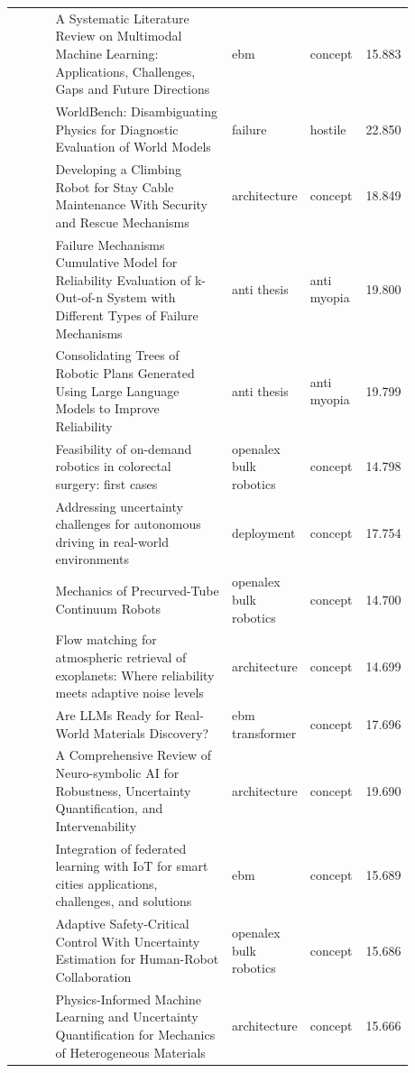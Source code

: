 \documentclass{article}
\begin{document}
\begin{center}
\begin{longtable}{p{0.12\linewidth}p{0.48\linewidth}p{0.14\linewidth}p{0.14\linewidth}r}
\citep{pool88_52} & A Systematic Literature Review on Multimodal Machine Learning: Applications, Challenges, Gaps and Future Directions & ebm & concept & 15.883\\
\citep{pool88_53} & WorldBench: Disambiguating Physics for Diagnostic Evaluation of World Models & failure & hostile & 22.850\\
\citep{pool88_54} & Developing a Climbing Robot for Stay Cable Maintenance With Security and Rescue Mechanisms & architecture & concept & 18.849\\
\citep{pool88_55} & Failure Mechanisms Cumulative Model for Reliability Evaluation of k-Out-of-n System with Different Types of Failure Mechanisms & anti thesis & anti myopia & 19.800\\
\citep{pool88_56} & Consolidating Trees of Robotic Plans Generated Using Large Language Models to Improve Reliability & anti thesis & anti myopia & 19.799\\
\citep{pool88_57} & Feasibility of on-demand robotics in colorectal surgery: first cases & openalex bulk robotics & concept & 14.798\\
\citep{pool88_58} & Addressing uncertainty challenges for autonomous driving in real-world environments & deployment & concept & 17.754\\
\citep{pool88_59} & Mechanics of Precurved-Tube Continuum Robots & openalex bulk robotics & concept & 14.700\\
\citep{pool88_60} & Flow matching for atmospheric retrieval of exoplanets: Where reliability meets adaptive noise levels & architecture & concept & 14.699\\
\citep{pool88_61} & Are LLMs Ready for Real-World Materials Discovery? & ebm transformer & concept & 17.696\\
\citep{pool88_62} & A Comprehensive Review of Neuro-symbolic AI for Robustness, Uncertainty Quantification, and Intervenability & architecture & concept & 19.690\\
\citep{pool88_63} & Integration of federated learning with IoT for smart cities applications, challenges, and solutions & ebm & concept & 15.689\\
\citep{pool88_64} & Adaptive Safety-Critical Control With Uncertainty Estimation for Human-Robot Collaboration & openalex bulk robotics & concept & 15.686\\
\citep{pool88_65} & Physics-Informed Machine Learning and Uncertainty Quantification for Mechanics of Heterogeneous Materials & architecture & concept & 15.666\\

\end{longtable}
\end{center}
\end{document}
